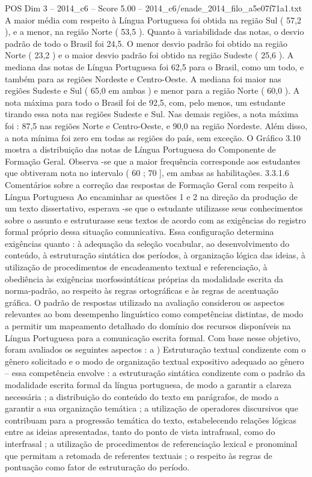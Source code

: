 \begin{textsample}{POS Dim 3 – 2014\_c6 – Score 5.00 – 2014\_c6/enade\_2014\_filo\_a5e07f71a1.txt}
A maior média com respeito à Língua Portuguesa foi obtida na região Sul ( 57,2 ), e a menor, na região Norte ( 53,5 ).
Quanto à variabilidade das notas, o desvio padrão de todo o Brasil foi 24,5.
O menor desvio padrão foi obtido na região Norte ( 23,2 ) e o maior desvio padrão foi obtido na região Sudeste ( 25,6 ).
A mediana das notas de Língua Portuguesa foi 62,5 para o Brasil, como um todo, e também para as regiões Nordeste e Centro-Oeste.
A mediana foi maior nas regiões Sudeste e Sul ( 65,0 em ambas ) e menor para a região Norte ( 60,0 ).
A nota máxima para todo o Brasil foi de 92,5, com, pelo menos, um estudante tirando essa nota nas regiões Sudeste e Sul.
Nas demais regiões, a nota máxima foi : 87,5 nas regiões Norte e Centro-Oeste, e 90,0 na região Nordeste.
Além disso, a nota mínima foi zero em todas as regiões do país, sem exceção.
O Gráfico 3.10 mostra a distribuição das notas de Língua Portuguesa do Componente de Formação Geral.
Observa -se que a maior frequência corresponde aos estudantes que obtiveram nota no intervalo ( 60 ; 70 ], em ambas as habilitações. 3.3.1.6 Comentários sobre a correção das respostas de Formação Geral com respeito à Língua Portuguesa Ao encaminhar as questões 1 e 2 na direção da produção de um texto dissertativo, esperava -se que o estudante utilizasse seus conhecimentos sobre o assunto e estruturasse seus textos de acordo com as exigências do registro formal próprio dessa situação comunicativa.
Essa configuração determina exigências quanto : à adequação da seleção vocabular, ao desenvolvimento do conteúdo, à estruturação sintática dos períodos, à organização lógica das ideias, à utilização de procedimentos de encadeamento textual e referenciação, à obediência às exigências morfossintáticas próprias da modalidade escrita da norma-padrão, ao respeito às regras ortográficas e às regras de acentuação gráfica.
O padrão de respostas utilizado na avaliação considerou os aspectos relevantes ao bom desempenho linguístico como competências distintas, de modo a permitir um mapeamento detalhado do domínio dos recursos disponíveis na Língua Portuguesa para a comunicação escrita formal.
Com base nesse objetivo, foram avaliados os seguintes aspectos : a ) Estruturação textual condizente com o gênero solicitado e o modo de organização textual expositivo adequado ao gênero – essa competência envolve : a estruturação sintática condizente com o padrão da modalidade escrita formal da língua portuguesa, de modo a garantir a clareza necessária ; a distribuição do conteúdo do texto em parágrafos, de modo a garantir a sua organização temática ; a utilização de operadores discursivos que contribuam para a progressão temática do texto, estabelecendo relações lógicas entre as ideias apresentadas, tanto do ponto de vista intrafrasal, como do interfrasal ; a utilização de procedimentos de referenciação lexical e pronominal que permitam a retomada de referentes textuais ; o respeito às regras de pontuação como fator de estruturação do período.

\end{textsample}
